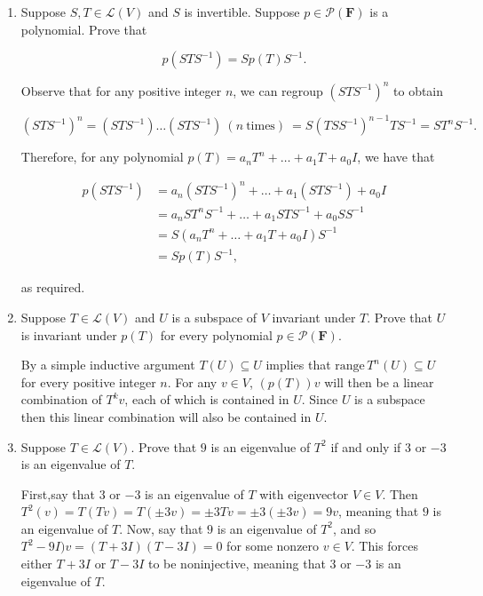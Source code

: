 \documentclass{book}
\begin{document}
\begin{enumerate}
\item Suppose \(S,T \in \mathcal{L}(V)\) and \(S\) is invertible.  Suppose \(p \in \mathcal{P}(\textbf{F})\) is a polynomial.  Prove that

\begin{equation*}
    p(STS^{-1})=Sp(T)S^{-1}.
\end{equation*}

Observe that for any positive integer \(n\), we can regroup \((STS^{-1})^n\) to obtain

\begin{equation*}
    (STS^{-1})^n = (STS^{-1})\dots(STS^{-1}) \ (n \ \text{times}) \ =S(TSS^{-1})^{n-1}TS^{-1} = ST^nS^{-1}.
\end{equation*}

Therefore, for any polynomial \(p(T)=a_nT^n+\dots+a_1T+a_0I\), we have that

\begin{equation*}
    \begin{split}
        p(STS^{-1}) &= a_n(STS^{-1})^n+\dots+a_1(STS^{-1})+a_0I \\
        &= a_nST^nS^{-1}+\dots+a_1STS^{-1}+a_0SS^{-1} \\
        &= S(a_nT^n+\dots+a_1T+a_0I)S^{-1} \\
        &= Sp(T)S^{-1},
    \end{split}
\end{equation*}

as required.

\item Suppose \(T \in \mathcal{L}(V)\) and \(U\) is a subspace of \(V\) invariant under \(T\).  Prove that \(U\) is invariant under \(p(T)\) for every polynomial \(p \in \mathcal{P}(\textbf{F})\).

By a simple inductive argument \(T(U) \subseteq U\) implies that \(\text{range} \, T^n(U) \subseteq U\) for every positive integer \(n\).  For any \(v \in V\), \(\left(p(T)\right)v\) will then be a linear combination of \(T^k v\), each of which is contained in \(U\).  Since \(U\) is a subspace then this linear combination will also be contained in \(U\).

\item Suppose \(T \in \mathcal{L}(V)\).  Prove that \(9\) is an eigenvalue of \(T^2\) if and only if \(3\) or \(-3\) is an eigenvalue of \(T\).

First,say that \(3\) or \(-3\) is an eigenvalue of \(T\) with eigenvector \(V \in V\).  Then \(T^2(v)=T(Tv)=T(\pm 3v)=\pm3Tv=\pm3(\pm3v)=9v\), meaning that \(9\) is an eigenvalue of \(T\).  Now, say that \(9\) is an eigenvalue of \(T^2\), and so \(T^2-9I)v=(T+3I)(T-3I)=0\) for some nonzero \(v \in V\).  This forces either \(T+3I\) or \(T-3I\) to be noninjective, meaning that \(3\) or \(-3\) is an eigenvalue of \(T\).


\end{enumerate}
\end{document}
